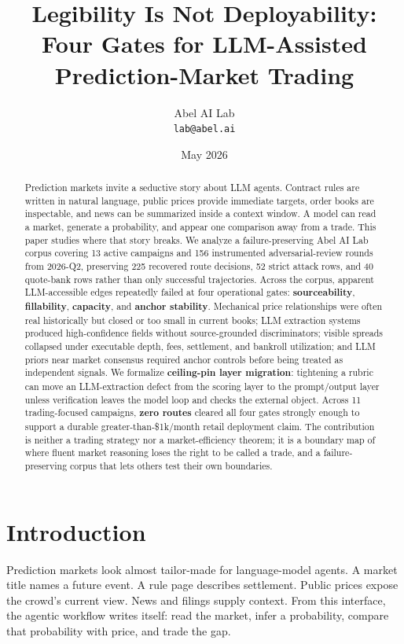 \documentclass[11pt]{article}
\title{Legibility Is Not Deployability:\\Four Gates for LLM-Assisted Prediction-Market Trading}
\author{Abel AI Lab\\\texttt{lab@abel.ai}}
\date{May 2026}
\begin{document}
\maketitle

\begin{abstract}
Prediction markets invite a seductive story about LLM agents. Contract rules are written in natural language, public prices provide immediate targets, order books are inspectable, and news can be summarized inside a context window. A model can read a market, generate a probability, and appear one comparison away from a trade. This paper studies where that story breaks. We analyze a failure-preserving Abel AI Lab corpus covering 13 active campaigns and 156 instrumented adversarial-review rounds from 2026-Q2, preserving 225 recovered route decisions, 52 strict attack rows, and 40 quote-bank rows rather than only successful trajectories. Across the corpus, apparent LLM-accessible edges repeatedly failed at four operational gates: \textbf{sourceability}, \textbf{fillability}, \textbf{capacity}, and \textbf{anchor stability}. Mechanical price relationships were often real historically but closed or too small in current books; LLM extraction systems produced high-confidence fields without source-grounded discriminators; visible spreads collapsed under executable depth, fees, settlement, and bankroll utilization; and LLM priors near market consensus required anchor controls before being treated as independent signals. We formalize \textbf{ceiling-pin layer migration}: tightening a rubric can move an LLM-extraction defect from the scoring layer to the prompt/output layer unless verification leaves the model loop and checks the external object. Across 11 trading-focused campaigns, \textbf{zero routes} cleared all four gates strongly enough to support a durable greater-than-\$1k/month retail deployment claim. The contribution is neither a trading strategy nor a market-efficiency theorem; it is a boundary map of where fluent market reasoning loses the right to be called a trade, and a failure-preserving corpus that lets others test their own boundaries.
\end{abstract}

\section{Introduction}

Prediction markets \citep{WolfersZitzewitz2004} look almost tailor-made for language-model agents. A market title names a future event. A rule page describes settlement. Public prices expose the crowd's current view. News and filings supply context. From this interface, the agentic workflow writes itself: read the market, infer a probability, compare that probability with price, and trade the gap.
\end{document}
